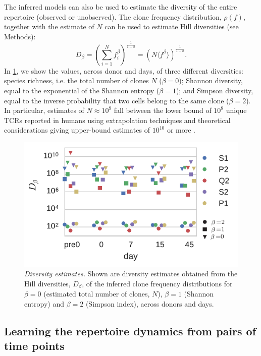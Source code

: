 \documentclass[pre,twocolumn,english,longbibliography]{revtex4}
\newcommand{\beq}{\begin{equation}}
\newcommand{\eeq}{\end{equation}}
\newcommand{\<}{\langle}
\renewcommand{\>}{\rangle}
\begin{document}
The inferred models can also be used to estimate the diversity of the entire repertoire (observed or unobserved).
The clone frequency distribution, $\rho(f)$, together with the estimate of $N$ can be used to estimate Hill diversities (see Methods):
\beq
D_\beta={\left(\sum_{i=1}^N f_i^\beta\right)}^{\frac{1}{1-\beta}}={\left(N\<f^\beta\>\right)}^{\frac{1}{1-\beta}}.
\eeq
In  \cref{fig:div_estimates}, we show the values, across donor and days, of three different diversities: species richness, i.e. the total number of clones $N$ ($\beta=0$); Shannon diversity, equal to the exponential of the Shannon entropy ($\beta=1$); and Simpson diversity, equal to the inverse probability that two cells belong to the same clone ($\beta=2$). In particular, estimates of $N\approx 10^9$ fall between the lower bound of $10^8$ unique TCRs reported in humans using extrapolation techniques \cite{Qi2014} and theoretical considerations giving upper-bound estimates of $10^{10}$ \cite{Lythe2016} or more \cite{Mora2019}.

\begin{figure}
\includegraphics[width=\linewidth]{fig4_div_estimates}
\centering{}
\caption{\emph{Diversity estimates.} Shown are diversity estimates obtained from the Hill diversities, $D_\beta$, of the inferred clone frequency distributions for $\beta=0$ (estimated total number of clones, $N$), $\beta=1$ (Shannon entropy) and $\beta=2$ (Simpson index), across donors and days.
\label{fig:div_estimates}}
\end{figure}



\subsection*{Learning the repertoire dynamics from pairs of time points}
\end{document}
